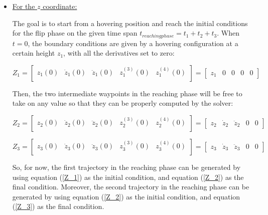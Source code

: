 \documentclass{thesisreport}
\begin{document}
\begin{itemize}
	\item \underline{For the $z$ coordinate:}
	
The goal is to start from a hovering position and reach the initial conditions for the flip phase on the given time span $t_{reaching phase}=t_1+t_2+t_3$. When $t=0$, the boundary conditions are given by a hovering configuration at a certain height $z_1$, with all the derivatives set to zero:

\begin{equation}\label{Z_1}
	Z_1 = \begin{bmatrix}
	z_1(0) & \dot{z}_1 (0) & \ddot{z}_1 (0) & z_1^{(3)} (0) & z_1^{(4)} (0) \\
	\end{bmatrix} = \begin{bmatrix}
	z_1 & 0 & 0 & 0 & 0
	\end{bmatrix} 
\end{equation}

Then, the two intermediate waypoints in the reaching phase will be free to take on any value so that they can be properly computed by the solver:

\begin{equation}\label{Z_2}
	Z_2 = \begin{bmatrix}
	z_2(0) & \dot{z}_2 (0) & \ddot{z}_2 (0) & z_2^{(3)} (0) & z_2^{(4)} (0) \\
	\end{bmatrix} = \begin{bmatrix}
	z_2 & \dot{z}_2 & \ddot{z}_2 & 0 & 0
	\end{bmatrix} 
\end{equation}

\begin{equation}\label{Z_3}
	Z_3 = \begin{bmatrix}
	z_3(0) & \dot{z}_3 (0) & \ddot{z}_3 (0) & z_3^{(3)} (0) & z_3^{(4)} (0) \\
	\end{bmatrix} = \begin{bmatrix}
	z_3 & \dot{z}_3 & \ddot{z}_3 & 0 & 0
	\end{bmatrix} 
\end{equation}

So, for now, the first trajectory in the reaching phase can be generated by using equation (\ref{Z_1}) as the initial condition, and equation (\ref{Z_2}) as the final condition. Moreover, the second trajectory in the reaching phase can be generated by using equation (\ref{Z_2}) as the initial condition, and equation (\ref{Z_3}) as the final condition.


\end{itemize}
\end{document}
